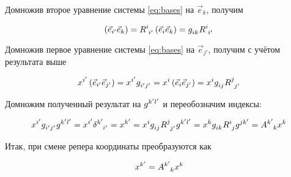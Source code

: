 \documentclass{article}
\begin{document}
Домножив второе уравнение системы \eqref{eq:bases} на $\vec{e}_k$, получим

\begin{equation*}
    \left(\vec{e}_{i'}\vec{e}_k\right)=\tensor{R}{^i_{i'}}\left(\vec{e}_i\vec{e}_k\right)=\tensor{g}{_i_k}\tensor{R}{^i_{i'}}
\end{equation*}

Домножив первое уравнение системы \eqref{eq:bases} на $\vec{e}_{j'}$, получим с учётом результата выше

\begin{equation*}
    \tensor{x}{^{i'}}\left(\vec{e}_{i'}\vec{e}_{j'}\right)=\tensor{x}{^{i'}}\tensor{g}{_{i'}_{j'}}=\tensor{x}{^i}\left(\vec{e}_i\vec{e}_{j'}\right)=\tensor{x}{^i}\tensor{g}{_i_j}\tensor{R}{^j_{j'}}
\end{equation*}

Домножим полученный результат на $\tensor{g}{^{k'}^{l'}}$ и переобозначим индексы:

\begin{equation*}
    \tensor{x}{^{i'}}\tensor{g}{_{i'}_{j'}}\tensor{g}{^{k'}^{l'}}=\tensor{x}{^{i'}}\tensor{\delta}{^{k'}_{i'}}=\tensor{x}{^{k'}}=\tensor{x}{^i}\tensor{g}{_i_j}\tensor{R}{^j_{j'}}\tensor{g}{^{k'}^{l'}}=\tensor{x}{^k}\tensor{g}{_i_k}\tensor{R}{^i_j}\tensor{g}{^j^{k'}}=\tensor{A}{^{k'}_k}\tensor{x}{^k}
\end{equation*}

Итак, при смене репера координаты преобразуются как 

\begin{equation}\label{eq:coord_change}
    \tensor{x}{^{k'}}=\tensor{A}{^{k'}_k}\tensor{x}{^k}
\end{equation}
\end{document}
